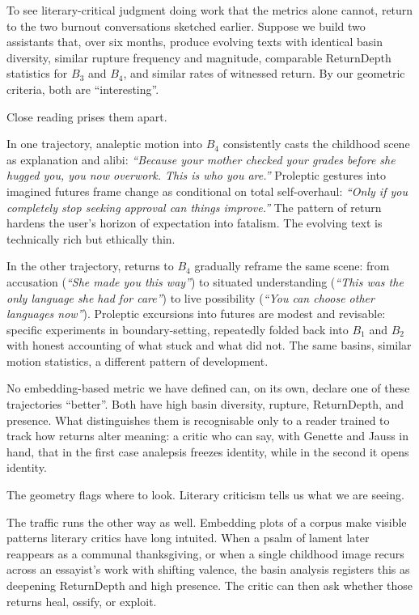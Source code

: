 \documentclass[12pt,a4paper]{article}
\begin{document}
To see literary-critical judgment doing work that the metrics alone cannot, return to the two burnout conversations sketched earlier. Suppose we build two assistants that, over six months, produce evolving texts with identical basin diversity, similar rupture frequency and magnitude, comparable ReturnDepth statistics for $B_3$ and $B_4$, and similar rates of witnessed return. By our geometric criteria, both are ``interesting''.

Close reading prises them apart.

In one trajectory, analeptic motion into $B_4$ consistently casts the childhood scene as explanation and alibi: \emph{``Because your mother checked your grades before she hugged you, you now overwork. This is who you are.''} Proleptic gestures into imagined futures frame change as conditional on total self-overhaul: \emph{``Only if you completely stop seeking approval can things improve.''} The pattern of return hardens the user's horizon of expectation into fatalism. The evolving text is technically rich but ethically thin.

In the other trajectory, returns to $B_4$ gradually reframe the same scene: from accusation (\emph{``She made you this way''}) to situated understanding (\emph{``This was the only language she had for care''}) to live possibility (\emph{``You can choose other languages now''}). Proleptic excursions into futures are modest and revisable: specific experiments in boundary-setting, repeatedly folded back into $B_1$ and $B_2$ with honest accounting of what stuck and what did not. The same basins, similar motion statistics, a different pattern of development.

No embedding-based metric we have defined can, on its own, declare one of these trajectories ``better''. Both have high basin diversity, rupture, ReturnDepth, and presence. What distinguishes them is recognisable only to a reader trained to track how returns alter meaning: a critic who can say, with Genette and Jauss in hand, that in the first case analepsis freezes identity, while in the second it opens identity.

The geometry flags where to look. Literary criticism tells us what we are seeing.

The traffic runs the other way as well. Embedding plots of a corpus make visible patterns literary critics have long intuited. When a psalm of lament later reappears as a communal thanksgiving, or when a single childhood image recurs across an essayist's work with shifting valence, the basin analysis registers this as deepening ReturnDepth and high presence. The critic can then ask whether those returns heal, ossify, or exploit.
\end{document}
